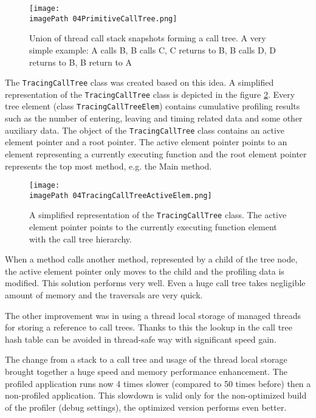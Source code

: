 \begin{figure}
	\centering
		\texttt{[image: \\imagePath 04PrimitiveCallTree.png]}
		\caption{ Union of thread call stack snapshots forming a call tree. A very simple example: A calls  B, B calls C, C returns to B, B calls D, D returns to B, B return to A }
	\label{fig:04PrimitiveCallTree}
\end{figure}

The \texttt{TracingCallTree} class was created based on this idea.
A simplified representation of the \texttt{TracingCallTree} class is depicted in the figure \ref{fig:04TracingCallTreeActiveElem}. Every tree element (class \texttt{TracingCallTreeElem}) contains cumulative profiling results such as the number of entering, leaving and timing related data and some other auxiliary data. The object of the \texttt{TracingCallTree} class contains an active element pointer and a root pointer. The active element pointer points to an element representing a currently executing function and the root element pointer represents the top most method, e.g. the Main method. 


\begin{figure}
	\centering
		\texttt{[image: \\imagePath 04TracingCallTreeActiveElem.png]}
		\caption{A simplified representation of the \texttt{TracingCallTree} class. The active element pointer points to the currently executing function element with the call tree hierarchy. }
	\label{fig:04TracingCallTreeActiveElem}
\end{figure}


When a method calls another method, represented by a child of the tree node, the active element pointer only moves to the child and the profiling data is modified. This solution performs very well. Even a huge call tree takes negligible amount of memory and the traversals are very quick. 

The other improvement was in using a thread local storage of managed threads for storing a reference to call trees. Thanks to this the lookup in the call tree hash table can be avoided in thread-safe way with significant speed gain. 

The change from a stack to a call tree and usage of the thread local storage brought together a huge speed and memory performance enhancement. The profiled application runs now 4 times slower (compared to 50 times before) then a non-profiled application. This slowdown is valid only for the non-optimized build of the profiler (debug settings), the optimized version performs even better. 


